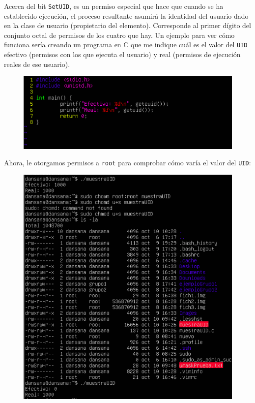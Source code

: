 \documentclass[10pt]{article}
\begin{document}
	Acerca del bit \verb|SetUID|, es un permiso especial que hace que cuando se ha establecido ejecución, el proceso resultante asumirá la identidad del usuario dado en la clase de usuario (propietario del elemento). Corresponde al primer dígito del conjunto octal de permisos de los cuatro que hay. Un ejemplo para ver cómo funciona sería creando un programa en C que me indique cuál es el valor del \verb|UID| efectivo (permisos con los que ejecuta el usuario) y real (permisos de ejecución reales de ese usuario).
	\begin{figure}[H]
		\setlength{\abovecaptionskip}{0cm}
		\setlength{\belowcaptionskip}{0cm}
		\centering
		\includegraphics[width=0.9\linewidth]{Recursos/muestraUID.png}
	\end{figure}
	Ahora, le otorgamos permisos a \verb|root| para comprobar cómo varía el valor del \verb|UID|:
	\begin{figure}[H]
		\setlength{\abovecaptionskip}{0cm}
		\setlength{\belowcaptionskip}{0cm}
		\centering
		\includegraphics[width=0.7\linewidth]{Recursos/rootUID.png}
	\end{figure}
	
\end{document}
